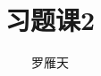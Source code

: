 \documentclass[12pt]{article}
\newcommand{\hei}{\CJKfamily{hei}}                          %
\begin{document}
\author{罗雁天}
\title{习题课2}
\maketitle

\medskip

\begin{enumerate}

%
%	

\end{enumerate}
\end{document}
